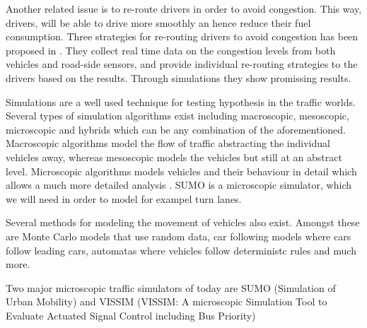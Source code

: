 Another related issue is to re-route drivers in order to avoid congestion. This way, drivers, will be able to drive more smoothly an hence reduce their fuel consumption. 
Three strategies for re-routing drivers to avoid congestion has been proposed in \cite{congestionAvoidance}. 
They collect real time data on the congestion levels from both vehicles and road-side sensors, and provide individual re-routing strategies to the drivers based on the results. Through simulations they show promissing results.

Simulations are a well used technique for testing hypothesis in the traffic worlds.
Several types of simulation algorithms exist including macroscopic, mesoscopic, microscopic and hybrids which can be any combination of the aforementioned. 
Macroscopic algorithms model the flow of traffic abstracting the individual vehicles away, whereas mesoscopic models the vehicles but still at an abstract level. 
Microscopic algorithms models vehicles and their behaviour in detail which allows a much more detailed analysis \cite{meso-micro}. 
SUMO is a microscopic simulator, which we will need in order to model for exampel turn lanes.

Several methods for modeling the movement of vehicles also exist. Amongst these are Monte Carlo models \cite{} that use random data, car following models \cite{} where cars follow leading cars, automatas where vehicles follow deterministc rules \cite{} and much more.

Two major microscopic traffic simulators of today are SUMO (Simulation of Urban Mobility)\cite{sumo} and VISSIM (VISSIM: A microscopic Simulation Tool to Evaluate Actuated Signal Control including Bus Priority)









